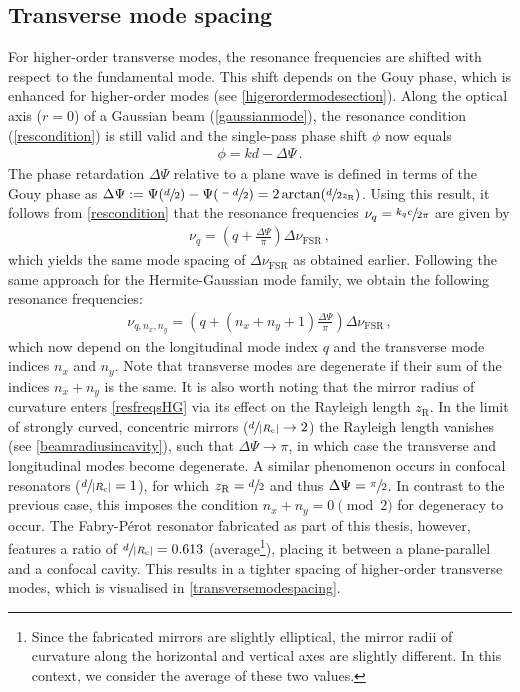 \documentclass[../Thesis-IJspeert.tex]{subfiles}
\begin{document}
\subsection{Transverse mode spacing}
For higher-order transverse modes, the resonance frequencies are shifted with respect to the fundamental mode. This shift depends on the Gouy phase, which is enhanced for higher-order modes (see \autoref{higerordermodesection}). Along the optical axis ($r=0$) of a Gaussian beam (\autoref{gaussianmode}), the resonance condition (\autoref{rescondition}) is still valid and the single-pass phase shift $\phi$ now equals
\begin{align}
\phi=kd-\Delta\Psi\,.
\end{align}
The phase retardation $\Delta\Psi$ relative to a plane wave is defined in terms of the Gouy phase as $\Delta\Psi:=\Psi(\sfrac{d}{2})-\Psi(\sfrac{-d}{2})=2\arctan(\sfrac{d}{2z_\mathrm{R}})$. Using this result, it follows from \autoref{rescondition} that the resonance frequencies $\nu_q = \sfrac{k_qc}{2\pi}$ are given by
\begin{align}
\label{resfreqsG}
\nu_q = \left(q + \frac{\Delta\Psi}{\pi} \right)\Delta\nu_\mathrm{FSR}\,,
\end{align}
which yields the same mode spacing of $\Delta\nu_\mathrm{FSR}$ as obtained earlier. Following the same approach for the Hermite-Gaussian mode family, we obtain the following resonance frequencies:
\begin{align}
\label{resfreqsHG}
\nu_{q,n_x,n_y} = \left(q + \left(n_x+n_y+1\right)\frac{\Delta\Psi}{\pi} \right)\Delta\nu_\mathrm{FSR}\,,
\end{align}
which now depend on the longitudinal mode index $q$ and the transverse mode indices $n_x$ and $n_y$. Note that transverse modes are degenerate if their sum of the indices $n_x+n_y$ is the same. It is also worth noting that the mirror radius of curvature enters \autoref{resfreqsHG} via its effect on the Rayleigh length $z_\mathrm{R}$. In the limit of strongly curved, concentric mirrors ($\sfrac{d}{\lvert R_\mathrm{c} \rvert}\rightarrow 2$) the Rayleigh length vanishes (see \autoref{beamradiusincavity}), such that $\Delta\Psi\rightarrow\pi$, in which case the transverse and longitudinal modes become degenerate. A similar phenomenon occurs in confocal resonators ($\sfrac{d}{\lvert R_\mathrm{c} \rvert}= 1$), for which $z_\mathrm{R}=\sfrac{d}{2}$ and thus $\Delta\Psi=\sfrac{\pi}{2}$. In contrast to the previous case, this imposes the condition $n_x+n_y = 0 \pmod 2$ for degeneracy to occur. The Fabry-Pérot resonator fabricated as part of this thesis, however, features a ratio of $\sfrac{d}{\lvert R_\mathrm{c} \rvert}= 0.613$ (average\footnote{Since the fabricated mirrors are slightly elliptical, the mirror radii of curvature along the horizontal and vertical axes are slightly different. In this context, we consider the average of these two values.}), placing it between a plane-parallel and a confocal cavity. This results in a tighter spacing of higher-order transverse modes, which is visualised in \autoref{transversemodespacing}.
\end{document}
